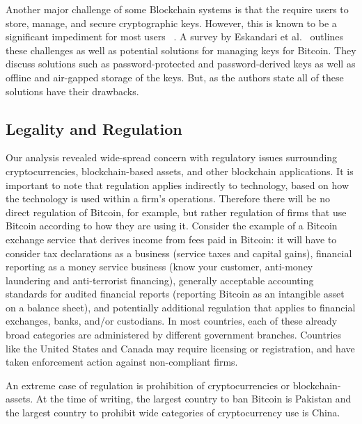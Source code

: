 Another major challenge of some Blockchain systems is that the require users to store, manage, and secure cryptographic keys. However, this is known to be a significant impediment for most users ~\cite{uss:WhiTyg99}.  A survey by Eskandari et al.~\cite{arxiv:EBSC15} outlines these challenges as well as potential solutions for managing keys for Bitcoin.  They discuss solutions such as password-protected and password-derived keys as well as offline and air-gapped storage of the keys.  But, as the authors state all of these solutions have their drawbacks.


\subsection{Legality and Regulation}
Our analysis revealed wide-spread concern with regulatory issues surrounding cryptocurrencies, blockchain-based assets, and other blockchain applications. It is important to note that regulation applies indirectly to technology, based on how the technology is used within a firm's operations. Therefore there will be no direct regulation of Bitcoin, for example, but rather regulation of firms that use Bitcoin according to how they are using it. Consider the example of a Bitcoin exchange service that derives income from fees paid in Bitcoin: it will have to consider tax declarations as a business (\eg service taxes and capital gains), financial reporting as a money service business (\eg know your customer, anti-money laundering and anti-terrorist financing), generally acceptable accounting standards for audited financial reports (\eg reporting Bitcoin as an intangible asset on a balance sheet), and potentially additional regulation that applies to financial exchanges, banks, and/or custodians. In most countries, each of these already broad categories are administered by different government branches. Countries like the United States and Canada may require licensing or registration, and have taken enforcement action against non-compliant firms.

An extreme case of regulation is prohibition of cryptocurrencies or blockchain-assets. At the time of writing, the largest country to ban Bitcoin is Pakistan and the largest country to prohibit wide categories of cryptocurrency use is China.
 

